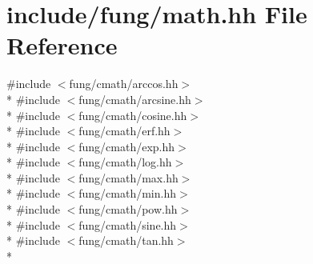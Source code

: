 \hypertarget{math_8hh}{}\section{include/fung/math.hh File Reference}
\label{math_8hh}
{\ttfamily \#include $<$fung/cmath/arccos.\+hh$>$}\\*
{\ttfamily \#include $<$fung/cmath/arcsine.\+hh$>$}\\*
{\ttfamily \#include $<$fung/cmath/cosine.\+hh$>$}\\*
{\ttfamily \#include $<$fung/cmath/erf.\+hh$>$}\\*
{\ttfamily \#include $<$fung/cmath/exp.\+hh$>$}\\*
{\ttfamily \#include $<$fung/cmath/log.\+hh$>$}\\*
{\ttfamily \#include $<$fung/cmath/max.\+hh$>$}\\*
{\ttfamily \#include $<$fung/cmath/min.\+hh$>$}\\*
{\ttfamily \#include $<$fung/cmath/pow.\+hh$>$}\\*
{\ttfamily \#include $<$fung/cmath/sine.\+hh$>$}\\*
{\ttfamily \#include $<$fung/cmath/tan.\+hh$>$}\\*
